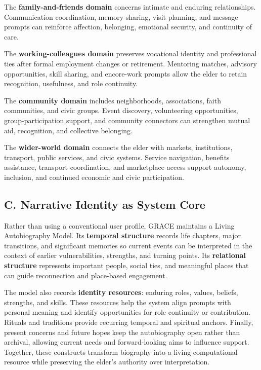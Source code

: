 \documentclass[
  journal,
]{IEEEtran}%
\begin{document}
The \textbf{family-and-friends domain} concerns intimate and enduring
relationships. Communication coordination, memory sharing, visit
planning, and message prompts can reinforce affection, belonging,
emotional security, and continuity of care.

The \textbf{working-colleagues domain} preserves vocational identity and
professional ties after formal employment changes or retirement.
Mentoring matches, advisory opportunities, skill sharing, and
encore-work prompts allow the elder to retain recognition, usefulness,
and role continuity.

The \textbf{community domain} includes neighborhoods, associations,
faith communities, and civic groups. Event discovery, volunteering
opportunities, group-participation support, and community connectors can
strengthen mutual aid, recognition, and collective belonging.

The \textbf{wider-world domain} connects the elder with markets,
institutions, transport, public services, and civic systems. Service
navigation, benefits assistance, transport coordination, and marketplace
access support autonomy, inclusion, and continued economic and civic
participation.

\subsection{C. Narrative Identity as System
Core}\label{c.-narrative-identity-as-system-core}

Rather than using a conventional user profile, GRACE maintains a Living
Autobiography Model. Its \textbf{temporal structure} records life
chapters, major transitions, and significant memories so current events
can be interpreted in the context of earlier vulnerabilities, strengths,
and turning points. Its \textbf{relational structure} represents
important people, social ties, and meaningful places that can guide
reconnection and place-based engagement.

The model also records \textbf{identity resources}: enduring roles,
values, beliefs, strengths, and skills. These resources help the system
align prompts with personal meaning and identify opportunities for role
continuity or contribution. Rituals and traditions provide recurring
temporal and spiritual anchors. Finally, present concerns and future
hopes keep the autobiography open rather than archival, allowing current
needs and forward-looking aims to influence support. Together, these
constructs transform biography into a living computational resource
while preserving the elder's authority over interpretation.
\end{document}
